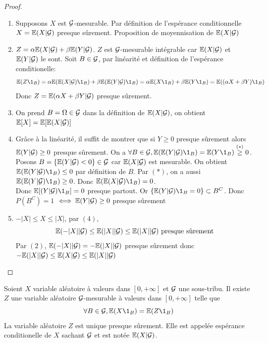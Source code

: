\documentclass[]{report}
\begin{document}
    \begin{proof}
        \begin{enumerate}
            \item Supposons $X$ est $\mathcal{G}$-mesurable. Par définition de l'espérance conditionnelle $X=\mathbb{E}(X|\mathcal{G})$ presque sûrement. Proposition de moyennisation de $\mathbb{E}(X|\mathcal{G})$
            \item $Z=\alpha\mathbb{E}(X|\mathcal{G})+\beta \mathbb{E}(Y|\mathcal{G})$. $Z$ est $\mathcal{G}$-mesurable intégrable car $\mathbb{E}(X|\mathcal{G})$ et $\mathbb{E}(Y|\mathcal{G})$ le sont. Soit $B\in \mathcal{G}$, par linéarité et définition de l'espérance conditionelle:
            \[\Ea(Z\1_B)=\alpha\Ea(\Ea(X|\Gr)\1_B)+\beta\Ea(\Ea(Y|\Gr)\1_B)=\alpha\Ea(X\1_B)+\beta\Ea(Y\1_B)=\Ea((\alpha X+\beta Y)\1_B)\]
            Donc $Z=\mathbb{E}(\alpha X+\beta Y|\mathcal{G})$ presque sûrement.
            \item On prend $B=\Omega\in \mathcal{G}$ dans la définition de $\mathbb{E}(X|\mathcal{G})$, on obtient $\mathbb{E}[X]=\mathbb{E}[\mathbb{E}(X|\mathcal{G})]$
            \item Grâce à la linéarité, il suffit de montrer que si $Y\ge 0$ presque sûrement alors $\mathbb{E}(Y|\mathcal{G})\ge 0$ presque sûrement. On a $\forall B\in \Gr,\Ea(\Ea(Y|\Gr)\1_B)=\Ea(Y\1_B)\overset{(*)}{\ge}0$. Posons $B=\{\mathbb{E}(Y|\mathcal{G})<0\}\in \mathcal{G}$ car $\mathbb{E}(X|\mathcal{G})$ est mesurable. On obtient $\Ea(\Ea(Y|\Gr)\1_B)\le 0$ par définition de $B$. Par $(*)$, on a aussi $\Ea(\Ea(Y|\Gr)\1_B)\ge 0$. Donc $\Ea(\Ea(X|\Gr)\1_B)=0$.\\
            Donc $\Ea[(Y|\Gr)\1_B]=0$ presque partout. Or $\{\Ea(Y|\Gr)\1_B=0\}\subset B^C$. Donc $P(B^C)=1$ $\iff \mathbb{E}(Y|\mathcal{G})\ge 0$ presque sûrement
            \item $-|X|\le X\le |X|$, par $(4)$,
            \[\mathbb{E}(-|X||\mathcal{G})\le \mathbb{E}(|X||\mathcal{G})\le \mathbb{E}(|X||\mathcal{G})\text{ presque sûrement}\]
            Par $(2)$, $\mathbb{E}(-|X||\mathcal{G})=-\mathbb{E}(|X||\mathcal{G})$ presque sûrement donc $-\mathbb{E}(|X||\mathcal{G})\le \mathbb{E}(X|\mathcal{G})\le \mathbb{E}(|X||\mathcal{G})$
        \end{enumerate}
    \end{proof}

    \begin{prop}{}{}
        Soient $X$ variable aléatoire à valeurs dans $[0,+\infty]$ et $\mathcal{G}$ une sous-tribu. Il existe $Z$ une variable aléatoire $\mathcal{G}$-mesurable à valeurs dans $[0,+\infty]$ telle que
        \[\forall B\in \Gr,\Ea(X\1_B)=\Ea(Z\1_B)\]
        La variable aléatoire $Z$ est unique presque sûrement. Elle est appelée espérance conditionelle de $X$ sachant $\mathcal{G}$ et est notée $\mathbb{E}(X|\mathcal{G})$.
    \end{prop}
\end{document}
